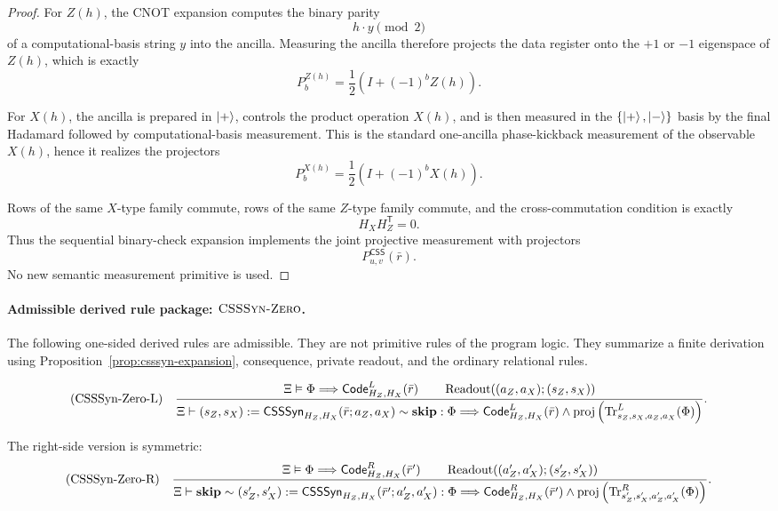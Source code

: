 \documentclass[acmsmall,screen,review,anonymous,nonacm]{acmart}
\theoremstyle{defn_style}
\begin{document}
\begin{proof}
For \(Z(h)\), the CNOT expansion computes the binary parity
\[
h\cdot y \pmod 2
\]
of a computational-basis string \(y\) into the ancilla. Measuring the ancilla
therefore projects the data register onto the \(+1\) or \(-1\) eigenspace of
\(Z(h)\), which is exactly
\[
P^{Z(h)}_b
=
\frac12(I+(-1)^bZ(h)).
\]

For \(X(h)\), the ancilla is prepared in \(\ket+\), controls the product
operation \(X(h)\), and is then measured in the \(\{\ket+,\ket-\}\) basis by
the final Hadamard followed by computational-basis measurement. This is the
standard one-ancilla phase-kickback measurement of the observable \(X(h)\),
hence it realizes the projectors
\[
P^{X(h)}_b
=
\frac12(I+(-1)^bX(h)).
\]

Rows of the same \(X\)-type family commute, rows of the same \(Z\)-type family
commute, and the cross-commutation condition is exactly
\[
H_XH_Z^{\mathsf T}=0.
\]
Thus the sequential binary-check expansion implements the joint projective
measurement with projectors
\[
P^{\mathsf{CSS}}_{u,v}(\bar r).
\]
No new semantic measurement primitive is used.
\end{proof}

\paragraph{Admissible derived rule package: \(\textsc{CSSSyn-Zero}\).}
\label{par:csssyn-zero}

The following one-sided derived rules are admissible. They are not primitive
rules of the program logic. They summarize a finite derivation using
Proposition~\ref{prop:csssyn-expansion}, consequence, private readout, and the
ordinary relational rules.

\[
\text{\rm (CSSSyn-Zero-L)}
\quad
\frac{
\Xi\vDash
\Phi
\Longrightarrow
\mathsf{Code}^{L}_{H_Z,H_X}(\bar r)
\qquad
\operatorname{Readout}((a_Z,a_X);(s_Z,s_X))
}{
\Xi
\vdash
(s_Z,s_X):=
\mathsf{CSSSyn}_{H_Z,H_X}(\bar r;a_Z,a_X)
\sim
\mathbf{skip}
:
\Phi
\Longrightarrow
\mathsf{Code}^{L}_{H_Z,H_X}(\bar r)
\land
\operatorname{proj}
\left(
\operatorname{Tr}^{L}_{s_Z,s_X,a_Z,a_X}(\Phi)
\right)
}.
\]

The right-side version is symmetric:
\[
\text{\rm (CSSSyn-Zero-R)}
\quad
\frac{
\Xi\vDash
\Phi
\Longrightarrow
\mathsf{Code}^{R}_{H_Z,H_X}(\bar r')
\qquad
\operatorname{Readout}((a'_Z,a'_X);(s'_Z,s'_X))
}{
\Xi
\vdash
\mathbf{skip}
\sim
(s'_Z,s'_X):=
\mathsf{CSSSyn}_{H_Z,H_X}(\bar r';a'_Z,a'_X)
:
\Phi
\Longrightarrow
\mathsf{Code}^{R}_{H_Z,H_X}(\bar r')
\land
\operatorname{proj}
\left(
\operatorname{Tr}^{R}_{s'_Z,s'_X,a'_Z,a'_X}(\Phi)
\right)
}.
\]
\end{document}
